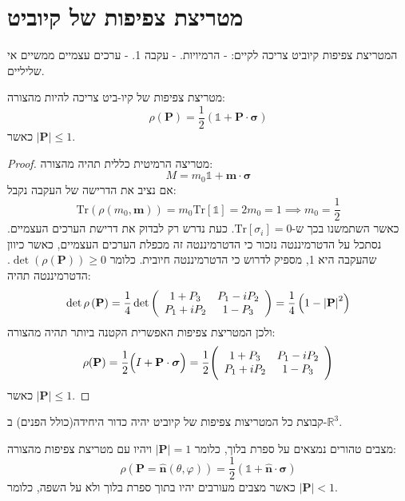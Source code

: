\documentclass{tstextbook}
\begin{document}
\section{מטריצת צפיפות של קיוביט}

\begin{proposition}
המטריצת צפיפות קיוביט צריכה לקיים:
- הרמיויות.
- עקבה 1.
- ערכים עצמיים ממשיים אי שליליים.

\end{proposition}
\begin{proposition}
מטריצת צפיפות של קיו-ביט צריכה להיות מהצורה:
$$\rho\left(\mathbf{P}\right)={\frac{1}{2}}\left(\mathbb{1}+\mathbf{P}\cdot\boldsymbol\sigma\right)$$
כאשר \(|\mathbf{P}|\leq 1\).

\end{proposition}
\begin{proof}
מטריצה הרמיטית כללית תהיה מהצורה:
$$M=m_{0}\mathbb{1} +\mathbf{m}\cdot \boldsymbol{\sigma}$$
אם נציב את הדרישה של העקבה נקבל:
$$\mathrm{Tr}\left( \rho\left( m_{0},\mathbf{m} \right) \right)=m_{0}\mathrm{Tr}\left[ \mathbb{1}  \right]=2m_{0}=1\implies m_{0}=\frac{1}{2}$$
כאשר השתמשנו בכך ש-\(\mathrm{Tr}\left[ \sigma_{i} \right]=0\). כעת נדרש רק לבדוק את דרישת הערכים העצמיים. נסתכל על הדטרמיננטה נזכור כי הדטרמיננטה זה מכפלת הערכים העצמיים, כאשר כיוון שהעקבה היא 1, מספיק לדרוש כי הדטרמיננטה חיובית. כלומר \(\det\left( \rho\left( \mathbf{P} \right) \right)\geq 0\). הדטרמיננטה תהיה:
$$\operatorname*{det}\rho\left(\mathbf{P}\right)={\frac{1}{4}}\operatorname*{det}\left(\begin{array}{c c}{{1+P_{3}}}&{{P_{1}-i P_{2}}}\\ {{P_{1}+i P_{2}}}&{{1-P_{3}}}\end{array}\right)={\frac{1}{4}}\left(1-\left|\mathbf{P}\right|^{2}\right)$$
ולכן המטריצת צפיפות האפשרית הקטנה ביותר תהיה מהצורה:
$$\rho(\mathbf{P})=\frac{1}{2}\Big(I+\mathbf{P}\cdot\boldsymbol{\sigma}\Big)=\frac{1}{2}\Bigg(\begin{array}{c c}{{1+P_{3}}}&{{P_{1}-i P_{2}}}\\ {{P_{1}+i P_{2}}}&{{1-P_{3}}}\end{array}\Bigg)$$
כאשר \(\left\lvert  \mathbf{P}  \right\rvert\leq 1\).

\end{proof}
\begin{corollary}
קבוצת כל המטריצות צפיפות של קיוביט יהיה כדור היחידה(כולל הפנים) ב-\(\mathbb{R}^{3}\). 

\end{corollary}
\begin{proposition}
מצבים טהורים נמצאים על ספרת בלוך, כלומר \(\left\lvert  \mathbf{P}  \right\rvert=1\) ויהיו עם מטריצת צפיפות מהצורה:
$$\rho\left(\mathbf{P}=\mathbf{\hat{n}}\left(\theta,\varphi\right)\right)={\frac{1}{2}}\left(\mathbb{1}+\mathbf{\hat{n}}\cdot\boldsymbol\sigma\right)$$
כאשר מצבים מעורבים יהיו בתוך ספרת בלוך ולא על השפה, כלומר \(\left\lvert  \mathbf{P}  \right\rvert< 1\).

\end{proposition}
\end{document}
